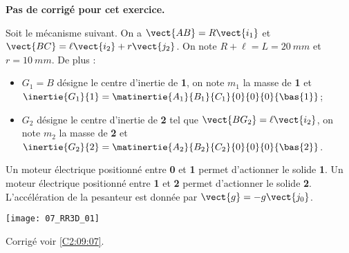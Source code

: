 \normalfalse \difficiletrue \tdifficilefalse
\correctionfalse


\setcounter{numques}{0}
\ifcorrection
\else
\textbf{Pas de corrigé pour cet exercice.}
\fi

\ifprof
\else
Soit le mécanisme suivant. On a $\vect{AB}=R\vect{i_1}$ et $\vect{BC}=\ell\vect{i_2}+r\vect{j_2}$. On note $R+\ell=L = \SI{20}{mm}$ et $r=\SI{10}{mm}$. De plus :
\begin{itemize}
\item $G_1=B$ désigne le centre d'inertie de \textbf{1}, on note $m_1$ la masse de \textbf{1} et $\inertie{G_1}{1}=\matinertie{A_1}{B_1}{C_1}{0}{0}{0}{\bas{1}}$; 
\item $G_2$ désigne le centre d'inertie de \textbf{2} tel que  $\vect{BG_2}=\ell\vect{i_2}$, on note $m_2$ la masse de \textbf{2} et $\inertie{G_2}{2}=\matinertie{A_2}{B_2}{C_2}{0}{0}{0}{\bas{2}}$.
\end{itemize}

Un moteur électrique positionné entre \textbf{0} et \textbf{1} permet d'actionner le solide \textbf{1}.
Un moteur électrique positionné entre \textbf{1} et \textbf{2} permet d'actionner le solide \textbf{2}.
L'accélération de la pesanteur est donnée par $\vect{g}=-g\vect{j_0}$.

\begin{center}
\texttt{[image: 07\_RR3D\_01]}
\end{center}
\fi


\ifprof
\else
\fi

\ifprof
\else
\begin{flushright}
\footnotesize{Corrigé  voir \ref{C2:09:07}.}
\end{flushright}%
\fi